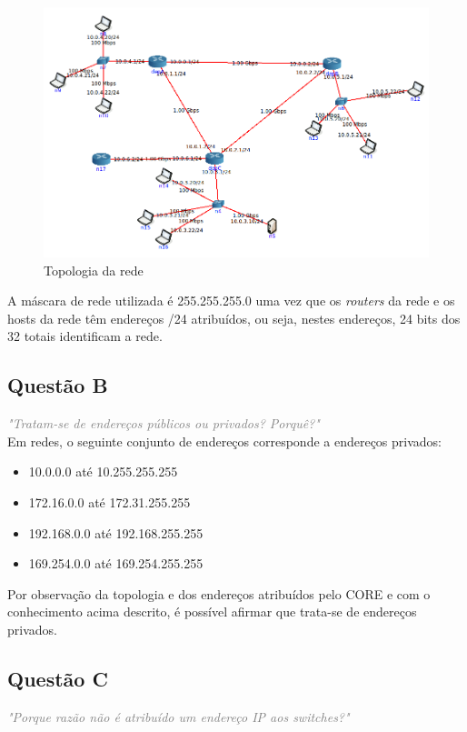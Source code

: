 \documentclass{llncs}
\newcommand{\questionE}[1]{\textcolor{gray}{\textit{"#1"}}}
\begin{document}
\begin{figure}[H]
\begin{center}
\includegraphics[width=12cm]{topoParteB.jpg}
\end{center}
\caption{Topologia da rede}
\end{figure}

A máscara de rede utilizada é 255.255.255.0 uma vez que os \textit{routers} da rede e os hosts da rede têm endereços /24 atribuídos, ou seja, nestes endereços, 24 bits dos 32 totais identificam a rede.

\subsection{Questão B}
\hspace{3mm}
\questionE{Tratam-se de endereços públicos ou privados? Porquê?}\\

Em redes, o seguinte conjunto de endereços corresponde a endereços privados:

\begin{itemize}
    \item 10.0.0.0 até 10.255.255.255
    \item 172.16.0.0 até 172.31.255.255 
    \item 192.168.0.0 até 192.168.255.255 
    \item 169.254.0.0 até 169.254.255.255
\end{itemize}

Por observação da topologia e dos endereços atribuídos pelo CORE e com o conhecimento acima descrito, é possível afirmar que trata-se de endereços privados.

\subsection{Questão C}
\hspace{3mm}
\questionE{Porque razão não é atribuído um endereço IP aos switches?}\\
\end{document}
